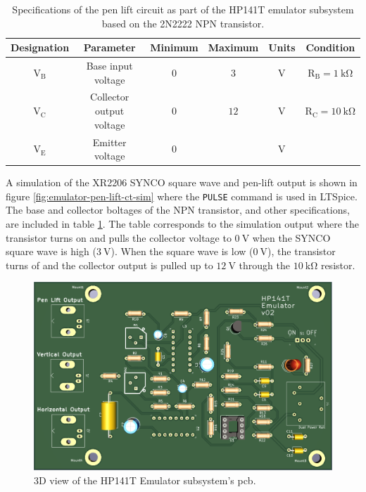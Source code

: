 \documentclass[class=report,11pt,crop=false]{standalone}
\begin{document}
	\begin{table}[h!]
		\centering
		\label{tab:emulator-pen-lift-specs}
		\begin{tabular}{cccccc}
			\hline
			\textbf{Designation} & \textbf{Parameter} & \textbf{Minimum} & \textbf{Maximum} & \textbf{Units} &  \textbf{Condition}\\
			\hline
			$\text{V}_\text{B}$	& Base input voltage & $0$ & $3$ & $\si{\volt}$ & $\text{R}_\text{B} = \SI{1}{\kilo\ohm}$\\ 
			\hline
			$\text{V}_\text{C}$ & Collector output voltage & $0$ & $12$ & $\si{\volt}$ & $\text{R}_\text{C} = \SI{10}{\kilo\ohm}$\\
			\hline
			$\text{V}_\text{E}$ & Emitter voltage & $0$ &	& $\si{\volt}$ &  \\
			\hline
		\end{tabular}
		\caption{Specifications of the pen lift circuit as part of the HP141T emulator subsystem based on the 2N2222 NPN transistor.}
	\end{table}

	A simulation of the XR2206 SYNCO square wave and pen-lift output is shown in figure \ref{fig:emulator-pen-lift-ct-sim} where the \texttt{PULSE} command is used in LTSpice. The base and collector boltages of the NPN transistor, and other specifications, are included in table \ref{tab:emulator-pen-lift-specs}. The table corresponds to the simulation output where the transistor turns on and pulls the collector voltage to $\SI{0}{\volt}$ when the SYNCO square wave is high ($\SI{3}{\volt}$). When the square wave is low ($\SI{0}{\volt}$), the transistor turns of and the collector output is pulled up to $\SI{12}{\volt}$ through the $\SI{10}{\kilo\ohm}$ resistor.  
	
	\begin{figure}[h!]
		\centering
		\includegraphics[width=0.5\linewidth]{Figures/Methodology/emulator-pcb-3d-front-v03}
		\caption{3D view of the HP141T Emulator subsystem's \acrshort{pcb}.}
		\label{fig:emulator-pcb}
	\end{figure}
	
\end{document}
